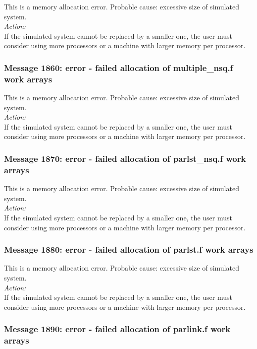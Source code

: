 This is a memory allocation error. Probable cause: excessive size of
simulated system. \\

\noindent
{\em Action:}\\
If the simulated system cannot be replaced by a smaller one, the user
must consider using more processors or a machine with larger memory
per processor.

\subsubsection*{Message 1860: error - failed allocation of
multiple\_nsq.f work arrays}

This is a memory allocation error. Probable cause: excessive size of
simulated system. \\

\noindent
{\em Action:}\\
If the simulated system cannot be replaced by a smaller one, the user
must consider using more processors or a machine with larger memory
per processor.

\subsubsection*{Message 1870: error - failed allocation of parlst\_nsq.f
work arrays}

This is a memory allocation error. Probable cause: excessive size of
simulated system. \\

\noindent
{\em Action:}\\
If the simulated system cannot be replaced by a smaller one, the user
must consider using more processors or a machine with larger memory
per processor.

\subsubsection*{Message 1880: error - failed allocation of parlst.f
work arrays}

This is a memory allocation error. Probable cause: excessive size of
simulated system. \\

\noindent
{\em Action:}\\
If the simulated system cannot be replaced by a smaller one, the user
must consider using more processors or a machine with larger memory
per processor.

\subsubsection*{Message 1890: error - failed allocation of parlink.f
work arrays}

